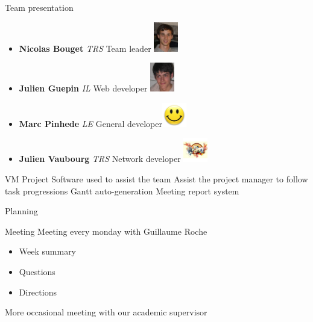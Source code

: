 \documentclass[12pt]{beamer}
\begin{document}
\begin{frame}{Team presentation}
    \begin{itemize}
	\item {\bf Nicolas Bouget} \emph{TRS} Team leader \hfill \includegraphics[width=30pt]{img/bouget.jpg}\\
	\vfill
	\item {\bf Julien Guepin} \emph{IL} Web developer \hfill \includegraphics[width=30pt]{img/guepin.jpg}
	\vfill
	\item {\bf Marc Pinhede} \emph{LE} General developer\hfill \includegraphics[width=30pt]{img/pinhede.jpg}
	\vfill
	\item {\bf Julien Vaubourg} \emph{TRS} Network developer \hfill \includegraphics[width=30pt]{img/vaubourg.jpg}
    \end{itemize}
\end{frame}


\begin{frame}{VM Project}
    Software used to assist the team
    \vfill
    Assist the project manager to follow task progressions
    \vfill
    Gantt auto-generation
    \vfill
    Meeting report system
\end{frame}

\begin{frame}{Planning}
\end{frame}
    
\begin{frame}{Meeting}
    Meeting every monday with Guillaume Roche
    \vfill
    \begin{itemize}
	\item Week summary
	\item Questions 
	\item Directions 
    \end{itemize}
    \vfill
    More occasional meeting with our academic supervisor
\end{frame}
\end{document}
